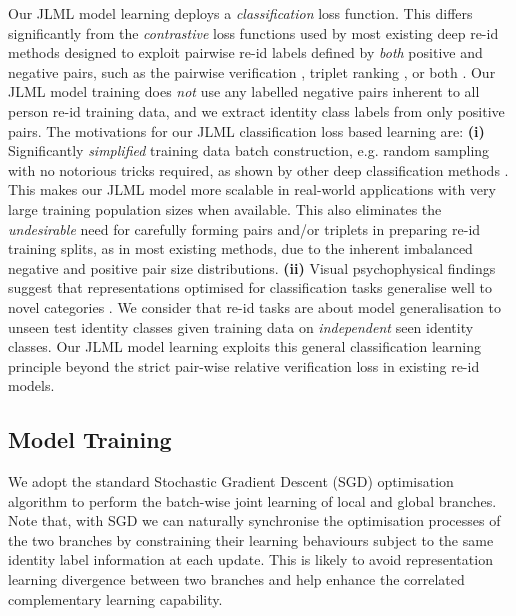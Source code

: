 \documentclass{article}
\begin{document}
\vspace{0.1cm}
Our JLML model learning deploys a {\em classification} loss
function. This differs significantly from the {\em
contrastive} loss functions used by most existing deep re-id methods
designed to exploit pairwise re-id labels defined by {\em both} positive and
negative pairs, such as the pairwise verification 
\cite{varior2016gated,subramaniam2016deep,ahmed2015improved,li2014deepreid},
triplet ranking \cite{Cheng_TCP},
or both \cite{wangjoint,chen2016multi}. Our JLML model training
does {\em not} use any labelled negative pairs inherent to all person
re-id training data, and we extract identity class labels from only
positive pairs.
The motivations for our JLML classification loss based learning are:
{\bf (i)} Significantly {\em simplified} training data batch
construction, e.g. random sampling with no notorious tricks required,
as shown by other deep classification methods \cite{krizhevsky2012imagenet}.
This makes our JLML model more scalable in real-world applications with
very large training population sizes when available. 
This also eliminates the {\em undesirable} need for 
carefully forming pairs and/or triplets in preparing re-id training
splits, as in most existing methods, due to the inherent imbalanced
negative and positive pair size distributions. 
{\bf (ii)} Visual psychophysical findings suggest that 
representations optimised for classification tasks generalise well to
novel categories \cite{edelman1998representation}. We consider that
re-id tasks are about model generalisation to unseen test identity classes
given training data on {\em independent} seen identity classes. 
Our JLML model learning exploits this general classification learning
principle beyond the strict pair-wise relative verification loss in
existing re-id models.

\subsection{Model Training}
We adopt the standard Stochastic Gradient Descent (SGD) optimisation algorithm \cite{krizhevsky2012imagenet}
to perform the batch-wise joint learning of local and
global branches.
Note that, with SGD we can naturally synchronise the optimisation processes 
of the two branches by constraining
their learning behaviours subject to the same identity label information
at each update.
This is likely to avoid representation learning divergence between two branches
and help enhance the correlated complementary learning capability.
\end{document}
